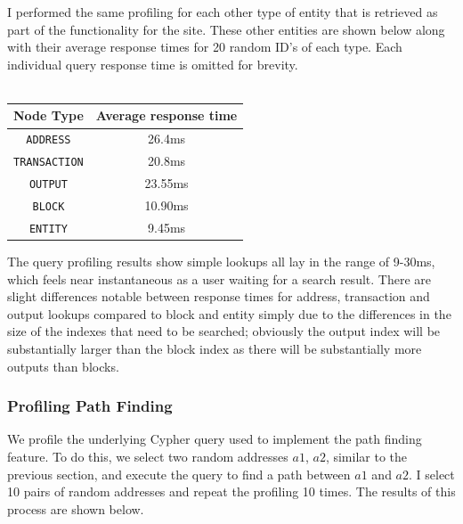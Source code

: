 I performed the same profiling for each other type of entity that is retrieved as part of the functionality for the site. These other entities are shown below along with their average response times for 20 random ID's of each type. Each individual query response time is omitted for brevity. 
\\\\
\begin{center}
\begin{tabular}{ |c|c| } 
 \hline
\textbf{Node Type} & \textbf{Average response time} \\\hline
\texttt{ADDRESS} & 26.4ms \\
\texttt{TRANSACTION} & 20.8ms \\
\texttt{OUTPUT} & 23.55ms \\
\texttt{BLOCK} & 10.90ms \\
\texttt{ENTITY} & 9.45ms \\
\hline
\end{tabular}
\end{center}
The query profiling results show simple lookups all lay in the range of 9-30ms, which feels near instantaneous as a user waiting for a search result. There are slight differences notable between response times for address, transaction and output lookups compared to block and entity simply due to the differences in the size of the indexes that need to be searched; obviously the output index will be substantially larger than the block index as there will be substantially more outputs than blocks. 

\subsubsection{Profiling Path Finding}\label{evaluation:path-finding-profile}
We profile the underlying Cypher query used to implement the path finding feature. To do this, we select two random addresses $a1$, $a2$, similar to the previous section, and execute the query to find a path between $a1$ and $a2$. I select 10 pairs of random addresses and repeat the profiling 10 times. The results of this process are shown below. 

